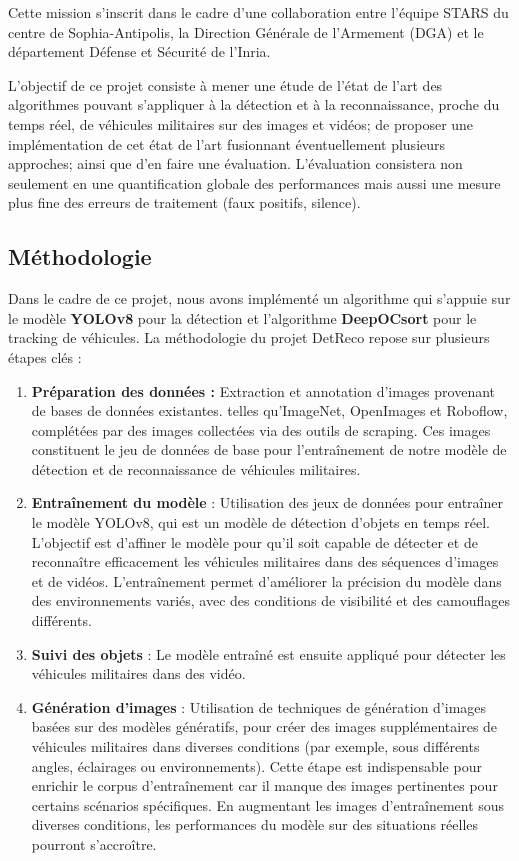 Cette mission s’inscrit dans le cadre d’une collaboration entre l’équipe STARS du centre de Sophia-Antipolis, la Direction Générale de l’Armement (DGA) et le département Défense et Sécurité de l’Inria.

L'objectif de ce projet consiste à mener une étude de l’état de l’art des algorithmes pouvant s’appliquer à la détection et à la reconnaissance, proche du temps réel, de véhicules militaires sur des images et vidéos; de proposer une implémentation de cet état de l’art fusionnant éventuellement plusieurs approches; ainsi que d’en faire une évaluation.
L’évaluation consistera non seulement en une quantification globale des performances mais aussi une mesure plus fine des erreurs de traitement (faux positifs, silence).


\subsection{Méthodologie}

Dans le cadre de ce projet, nous avons implémenté un algorithme qui s’appuie sur le modèle \textbf{YOLOv8} pour la détection et l’algorithme \textbf{DeepOCsort} pour le tracking de véhicules.
La méthodologie du projet DetReco repose sur plusieurs étapes clés :
\begin{enumerate}
	\item \textbf{Préparation des données :} Extraction et annotation d'images provenant de bases de données existantes. telles qu'ImageNet, OpenImages et Roboflow, complétées par des images collectées via des outils de scraping.
	      Ces images constituent le jeu de données de base pour l’entraînement de notre modèle de détection et de reconnaissance de véhicules militaires.

	\item \textbf{Entraînement du modèle} : Utilisation des jeux de données pour entraîner le modèle YOLOv8, qui est un modèle de détection d'objets en temps réel.
	      L'objectif est d'affiner le modèle pour qu'il soit capable de détecter et de reconnaître efficacement les véhicules militaires dans des séquences d’images et de vidéos.
	      L'entraînement permet d'améliorer la précision du modèle dans des environnements variés, avec des conditions de visibilité et des camouflages différents.

	\item \textbf{Suivi des objets} : Le modèle entraîné est ensuite appliqué pour détecter les véhicules militaires dans des vidéo.

	\item \textbf{Génération d’images} : Utilisation de techniques de génération d'images basées sur des modèles génératifs, pour créer des images supplémentaires de véhicules militaires dans diverses conditions (par exemple, sous différents angles, éclairages ou environnements).
	      Cette étape est indispensable pour enrichir le corpus d’entraînement car il manque des images pertinentes pour certains scénarios spécifiques.
	      En augmentant les images d'entraînement sous diverses conditions, les performances du modèle sur des situations réelles pourront s'accroître.

\end{enumerate}

